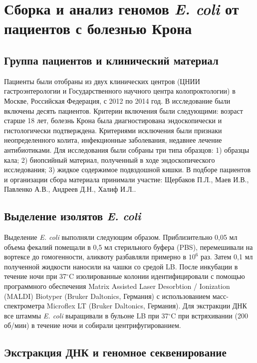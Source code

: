 \section{Сборка и анализ геномов \textit{E. coli} от пациентов с болезнью Крона}

\subsection{Группа пациентов и клинический материал}
Пациенты были отобраны из двух клинических центров (ЦНИИ гастроэнтерологии и Государственного научного центра колопроктологии) в Москве, Российская Федерация, с 2012 по 2014 год. В исследование были включены десять пациентов. Критерии включения были следующими: возраст старше 18 лет, болезнь Крона была диагностирована эндоскопически и гистологически подтверждена. Критериями исключения были признаки неопределенного колита, инфекционные заболевания, недавнее лечение антибиотиками. 
Для исследования были собраны три типа образцов: 1) образцы кала; 2) биопсийный материал, полученный в ходе эндоскопического исследования; 3) жидкое содержимое подвздошной кишки. В подборе пациентов и организации сбора материала принимали участие: Щербаков П.Л., Маев И.В., Павленко А.В., Андреев Д.Н., Халиф И.Л..

\subsection{Выделение изолятов \textit{E. coli}}

Выделение \textit{E. coli} выполняли следующим образом. Приблизительно 0,05 мл объема фекалий помещали в 0,5 мл стерильного буфера (PBS), перемешивали на вортексе до гомогенности, аликвоту разбавляли примерно в $10^6$ раз. Затем 0,1 мл полученной жидкости наносили на чашки со средой LB. После инкубации в течение ночи при 37$^\circ$C изолированные колонии идентифицировали с помощью программного обеспечения Matrix Assisted Laser Desorbtion / Ionization (MALDI) Biotyper (Bruker Daltonics, Германия) с использованием масс-спектрометра Microflex LT (Bruker Daltonics, Германия). Для экстракции ДНК все штаммы \textit{E. coli} выращивали в бульоне LB при 37$^\circ$C при встряхивании (200 об/мин) в течение ночи и собирали центрифугированием. 

\subsection{Экстракция ДНК и геномное секвенирование}

